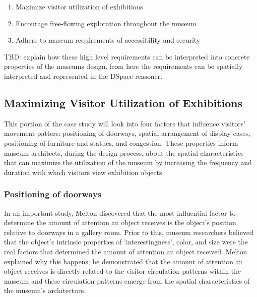 \documentclass[12pt]{ucthesis}
\begin{document}
\begin{enumerate}
\item Maximize visitor utilization of exhibitions
\item Encourage free-flowing exploration throughout the museum
\item Adhere to museum requirements of accessibility and security
\end{enumerate}

TBD: explain how these high level requirements can be interpreted into concrete properties of the museums design. from here the requirements can be spatially interpreted and represented in the DSpace reasoner.

\subsection{Maximizing Visitor Utilization of Exhibitions}
This portion of the case study will look into four factors that influence visitors' movement patters: positioning of doorways, spatial arrangement of display cases, positioning of furniture and statues, and congestion. These properties inform museum architects, during the design process, about the spatial characteristics that can maximize the utilization of the museum by increasing the frequency and duration with which visitors view exhibition objects. 

\subsubsection{Positioning of doorways}
In an important study, Melton \cite{Melton} discovered that the most influential factor to determine  the amount of attention an object receives is the object's position relative to doorways in a gallery room. Prior to this, museum researchers believed that the object's intrinsic properties of 'interestingness', color, and size were the real factors that determined the amount of attention an object received. Melton explained why this happens; he demonstrated that the amount of attention an object receives is directly related to the visitor circulation patterns within the museum and these circulation patterns emerge from the spatial characteristics of the museum's architecture.
\end{document}
